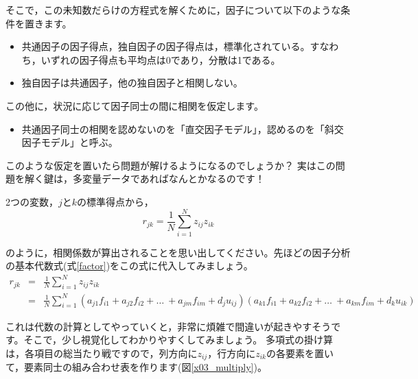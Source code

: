 \documentclass{ltjsbook}
\begin{document}
そこで，この未知数だらけの方程式を解くために，因子について以下のような条件を置きます。
\begin{itemize}
	\item 共通因子の因子得点，独自因子の因子得点は，標準化されている。すなわち，いずれの因子得点も平均点は0であり，分散は1である。
	\item 独自因子は共通因子，他の独自因子と相関しない。
\end{itemize}
この他に，状況に応じて因子同士の間に相関を仮定します。
\begin{itemize}
	\item 共通因子同士の相関を認めないのを「直交因子モデル」，認めるのを「斜交因子モデル」と呼ぶ。
\end{itemize}

このような仮定を置いたら問題が解けるようになるのでしょうか？ 実はこの問題を解く鍵は，多変量データであればなんとかなるのです！

2つの変数，$j$と$k$の標準得点から，
\begin{equation}
	r_{jk}=\frac{1}{N} \sum_{i=1}^{N} z_{ij}z_{ik}
\end{equation}

のように，相関係数が算出されることを思い出してください。先ほどの因子分析の基本代数式(式\ref{factor})をこの式に代入してみましょう。
\begin{equation}
	\begin{array}{ccl}
		r_{jk} & = & \displaystyle{\frac{1}{N} \sum_{i=1}^{N} z_{ij}z_{ik}}                                                                                                                  \\
		       & = & \displaystyle{\frac{1}{N} \sum_{i=1}^{N}}(a_{j1}f_{i1}+a_{j2}f_{i2}+ \ldots \ +a_{jm}f_{im}+d_{j}u_{ij})(a_{k1}f_{i1}+a_{k2}f_{i2}+ \ldots \ +a_{km}f_{im}+d_{k}u_{ik})
	\end{array}
\end{equation}

これは代数の計算としてやっていくと，非常に煩雑で間違いが起きやすそうです。そこで，少し視覚化してわかりやすくしてみましょう。
多項式の掛け算は，各項目の総当たり戦ですので，列方向に$z_{ij}$，行方向に$z_{ik}$の各要素を置いて，要素同士の組み合わせ表を作ります(図\ref{x03_multiply})。
\end{document}
